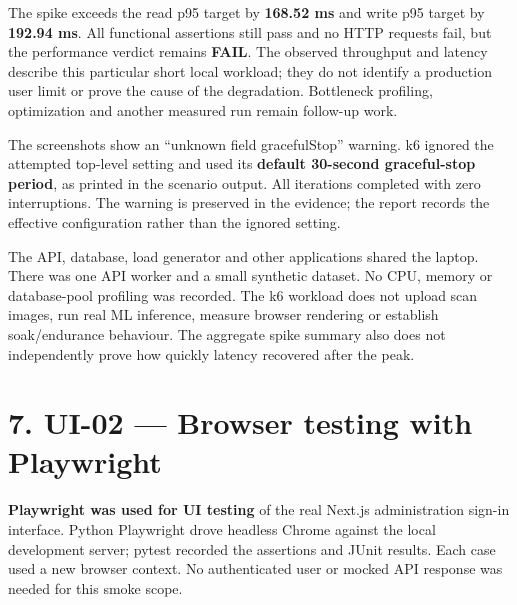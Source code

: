 \documentclass[
  11pt,
]{article}
\begin{document}
The spike exceeds the read p95 target by \textbf{168.52 ms} and write
p95 target by \textbf{192.94 ms}. All functional assertions still pass
and no HTTP requests fail, but the performance verdict remains
\textbf{FAIL}. The observed throughput and latency describe this
particular short local workload; they do not identify a production user
limit or prove the cause of the degradation. Bottleneck profiling,
optimization and another measured run remain follow-up work.

The screenshots show an ``unknown field gracefulStop'' warning. k6
ignored the attempted top-level setting and used its \textbf{default
30-second graceful-stop period}, as printed in the scenario output. All
iterations completed with zero interruptions. The warning is preserved
in the evidence; the report records the effective configuration rather
than the ignored setting.

The API, database, load generator and other applications shared the
laptop. There was one API worker and a small synthetic dataset. No CPU,
memory or database-pool profiling was recorded. The k6 workload does not
upload scan images, run real ML inference, measure browser rendering or
establish soak/endurance behaviour. The aggregate spike summary also
does not independently prove how quickly latency recovered after the
peak.

\section{7. UI-02 --- Browser testing with
Playwright}\label{ui-02-browser-testing-with-playwright}

\textbf{Playwright was used for UI testing} of the real Next.js
administration sign-in interface. Python Playwright drove headless
Chrome against the local development server; pytest recorded the
assertions and JUnit results. Each case used a new browser context. No
authenticated user or mocked API response was needed for this smoke
scope.
\end{document}

